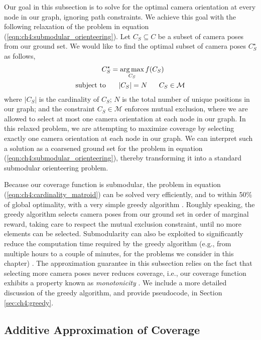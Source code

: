 Our goal in this subsection is to solve for the optimal camera orientation at every node in our graph, ignoring path constraints. 
We achieve this goal with the following relaxation of the problem in equation (\ref{eqn:ch4:submodular_orienteering}).
Let $C_S \subseteq C$ be a subset of camera poses from our ground set. We would like to find the optimal subset of camera poses  $C_S^{\star}$ as follows,
%
\begin{equation}
\begin{aligned}
C_S^{\star} = \operatorname*{arg\,max}_{C_S} f(C_S)~~~~~~~~~\\
\text{subject to} ~~~~~ \left\vert C_S \right\vert = N ~~~~~ C_S \in \mathcal{M}
\end{aligned}
\label{eqn:ch4:cardinality_matroid}
\end{equation}
%
where
$\left\vert C_S \right\vert$ is the cardinality of $C_S$;
$N$ is the total number of unique positions in our graph;
and the constraint $C_S \in \mathcal{M}$ enforces mutual exclusion, where we are allowed to select at most one camera orientation at each node in our graph.
In this relaxed problem, we are attempting to maximize coverage by selecting exactly one camera orientation at each node in our graph.
We can interpret such a solution as a coarsened ground set for the problem in equation (\ref{eqn:ch4:submodular_orienteering}), thereby transforming it into a standard submodular orienteering problem.

Because our coverage function is submodular, the problem in equation (\ref{eqn:ch4:cardinality_matroid}) can be solved very efficiently, and to within 50\% of global optimality, with a very simple greedy algorithm \cite{krause:2014}.
Roughly speaking, the greedy algorithm selects camera poses from our ground set in order of marginal reward, taking care to respect the mutual exclusion constraint, until no more elements can be selected.
Submodularity can also be exploited to significantly reduce the computation time required by the greedy algorithm (e.g., from multiple hours to a couple of minutes, for the problems we consider in this chapter) \cite{krause:2014}.
The approximation guarantee in this subsection relies on the fact that selecting more camera poses never reduces coverage, i.e., our coverage function exhibits a property known as \emph{monotonicity} \cite{krause:2014}.
We include a more detailed discussion of the greedy algorithm, and provide pseudocode, in Section \ref{sec:ch4:greedy}.

\subsection{Additive Approximation of Coverage}
\label{sec:ch4:trajectories_subgradient}

